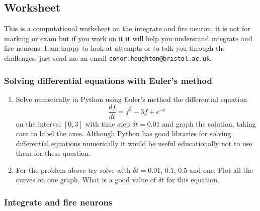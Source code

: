 \documentclass[11pt,a4paper]{scrartcl}
\begin{document}
\subsection*{Worksheet}

This is a computational worksheet on the integrate and fire neuron; it
is not for marking or exam but if you work on it it will help you
understand integrate and fire neurons. I am happy to look at attempts
or to talk you through the challenges, just send me an email
\texttt{conor.houghton@bristol.ac.uk}.


\subsubsection*{Solving differential equations with Euler's method}

\begin{enumerate}

\item Solve numerically in Python using Euler's method the differential equation
\begin{equation}
\frac{df}{dt}=f^2-3f+e^{-t}
\end{equation}
on the interval $[0,3]$ with time step $\delta t=0.01$ and graph the
solution, taking care to label the axes. Although Python has good
libraries for solving differential equations numerically it would be
useful educationally not to use them for these question.

\item For the problem above try solve with $\delta t=0.01$, $0.1$,
  $0.5$ and one. Plot all the curves on one graph. What is a good
  value of $\delta t$ for this equation.

\end{enumerate}

\subsubsection*{Integrate and fire neurons}
\end{document}
